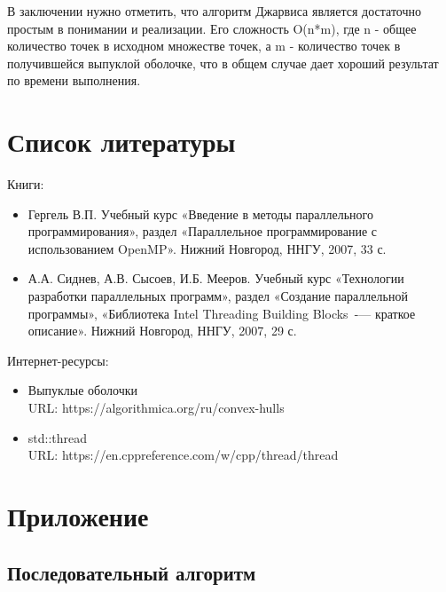 \documentclass{report}
\begin{document}
\par В заключении нужно отметить, что алгоритм Джарвиса является достаточно простым в понимании и реализации. Его сложность O(n*m), где n - общее количество точек в исходном множестве точек, а m - количество точек в получившейся выпуклой оболочке, что в общем случае дает хороший результат по времени выполнения.

\newpage

\section{Список литературы}

Книги:

\begin{itemize}
\item Гергель В.П. Учебный курс «Введение в методы параллельного программирования», раздел «Параллельное программирование с использованием OpenMP». Нижний Новгород, ННГУ, 2007, 33 с.
\item А.А. Сиднев, А.В. Сысоев, И.Б. Мееров. Учебный курс «Технологии разработки параллельных программ», раздел «Создание параллельной программы», «Библиотека Intel Threading Building Blocks~-— краткое описание». Нижний Новгород, ННГУ, 2007, 29 с.
\end{itemize}

\par Интернет-ресурсы:

\begin{itemize}
\item Выпуклые оболочки \\ URL: https://algorithmica.org/ru/convex-hulls
\item std::thread \\ URL: https://en.cppreference.com/w/cpp/thread/thread
\end{itemize}

\newpage

\section{Приложение}

\subsection{Последовательный алгоритм}




\end{document}
